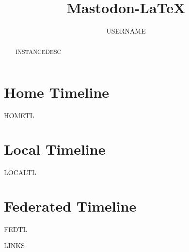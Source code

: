 \documentclass[runningheads]{llncs}
\begin{document}
\title{Mastodon-LaTeX}
\author{USERNAME}

%
\maketitle
%
\begin{abstract}
INSTANCEDESC

\end{abstract}
%
\section{Home Timeline}
HOMETL

\section{Local Timeline}
LOCALTL

\section{Federated Timeline}
FEDTL

\begin{thebibliography}{8}
LINKS
\end{thebibliography}
\end{document}
